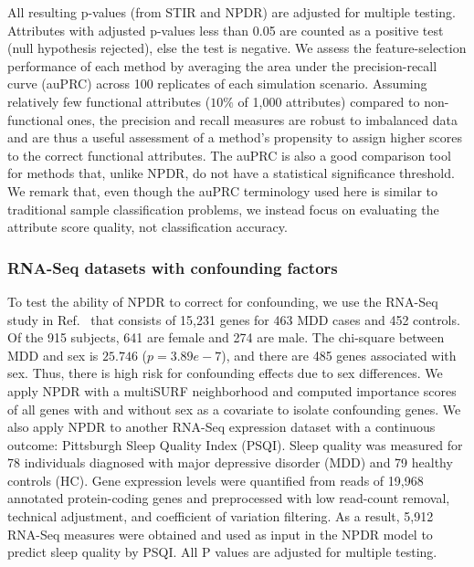 \documentclass[10pt]{article}
\begin{document}
All resulting p-values (from STIR and NPDR) are adjusted for multiple testing.
Attributes with adjusted p-values less than 0.05 are counted as a positive test (null hypothesis rejected), else the test is negative.
We assess the feature-selection performance of each method by averaging the area under the precision-recall curve (auPRC) across 100 replicates of each simulation scenario.
Assuming relatively few functional attributes ($10\%$ of 1,000 attributes) compared to non-functional ones, the precision and recall measures are robust to imbalanced data and are thus a useful assessment of a method's propensity to assign higher scores to the correct functional attributes. The auPRC is also a good comparison tool for methods that, unlike NPDR, do not have a statistical significance threshold. We remark that, even though the auPRC terminology used here is similar to traditional sample classification problems, we instead focus on evaluating the attribute score quality, not classification accuracy.

\subsubsection{RNA-Seq datasets with confounding factors}
To test the ability of NPDR to correct for confounding, we use the RNA-Seq study in Ref.~\cite{mostafavi14} that consists of 15,231 genes for 463 MDD cases and 452 controls.
Of the 915 subjects, 641 are female and 274 are male.
The chi-square between MDD and sex is $25.746$ ($p=3.89e-7$), and there are 485 genes associated with sex.
Thus, there is high risk for confounding effects due to sex differences.
We apply NPDR with a multiSURF neighborhood and computed importance scores of all genes with and without sex as a covariate to isolate confounding genes. 
We also apply NPDR to another RNA-Seq expression dataset with a continuous outcome: Pittsburgh Sleep Quality Index (PSQI). Sleep quality was measured for 78 individuals diagnosed with major depressive disorder (MDD) and 79 healthy controls (HC)\cite{le18}.
Gene expression levels were quantified from reads of 19,968 annotated protein-coding genes and preprocessed with low read-count removal, technical adjustment, and coefficient of variation filtering.
As a result, 5,912 RNA-Seq measures were obtained and used as input in the NPDR model to predict sleep quality by PSQI\cite{psqi}.
All P values are adjusted for multiple testing.
\end{document}
